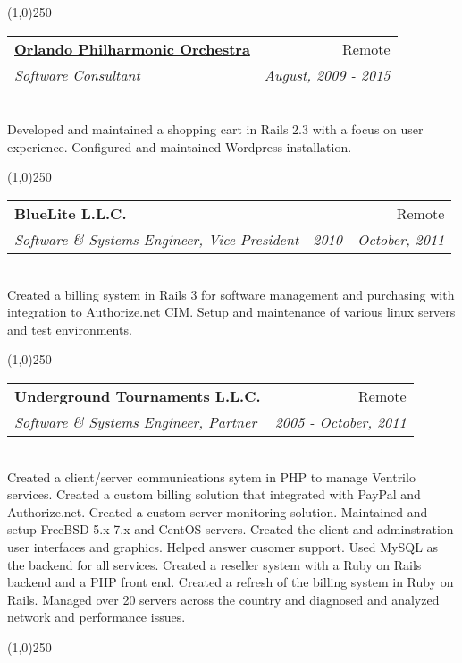 \documentclass[a4paper,11pt,sans]{article}
\makeatletter
\newcommand{\ressubheading}[4]{
\begin{tabular*}{7.0in}{l@{\extracolsep{\fill}}r}
		\textbf{#1} & #2 \\
		\textit{#3} & \textit{#4} \\
\end{tabular*}\vspace{-6pt}}
\makeatother
\begin{document}
\setlength{\parindent}{0pt}

\begin{center}
  \line(1,0){250}
\end{center}


\ressubheading{\href{http://orlandophil.org/}{Orlando Philharmonic Orchestra}}{Remote}{Software Consultant}{August, 2009 - 2015}

\hspace{5pt} \\

Developed and maintained a shopping cart in Rails 2.3 with a focus on user experience. Configured and maintained Wordpress installation.


\begin{center}
  \line(1,0){250}
\end{center}


\ressubheading{BlueLite L.L.C.}{Remote}{Software \& Systems Engineer, Vice President}{2010 - October, 2011}

\hspace{5pt} \\

Created a billing system in Rails 3 for software management and purchasing with integration to Authorize.net CIM.
Setup and maintenance of various linux servers and test environments.


\begin{center}
  \line(1,0){250}
\end{center}

\ressubheading{Underground Tournaments L.L.C.}{Remote}{Software \& Systems Engineer, Partner}{2005 - October, 2011}

\hspace{5pt} \\

Created a client/server communications sytem in PHP to manage Ventrilo services.
Created a custom billing solution that integrated with PayPal and Authorize.net.
Created a custom server monitoring solution.
Maintained and setup FreeBSD 5.x-7.x and CentOS servers.
Created the client and adminstration user interfaces and graphics.
Helped answer cusomer support.
Used MySQL as the backend for all services.
Created a reseller system with a Ruby on Rails backend and a PHP front end.
Created a refresh of the billing system in Ruby on Rails.
Managed over 20 servers across the country and diagnosed and analyzed network and performance issues.

\begin{center}
  \line(1,0){250}
\end{center}
\end{document}
